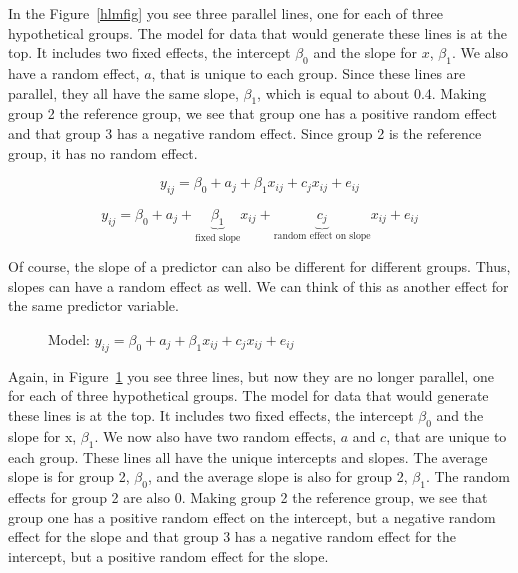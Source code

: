 In the Figure~\ref{hlmfig} you see three parallel lines, one for each of three hypothetical groups. The model for data that would generate these lines is at the top. It includes two fixed effects, the intercept $\beta_0$ and the slope for $x$, $\beta_1$. We also have a random effect, $a$, that is unique to each group. Since these lines are parallel, they all have the same slope, $\beta_1$, which is equal to about 0.4. Making group 2 the reference group, we see that group one has a positive random effect and that group 3 has a negative random effect. Since group 2 is the reference group, it has no random effect.

\[
y_{ij} = \beta_0+a_j+\beta_1x_{ij}+c_jx_{ij}+e_{ij}
\]

\[
y_{ij} = \beta_0+a_j+\underbrace{\beta_1}_{\text{fixed slope}}x_{ij}+\underbrace{c_j}_{\text{random effect on slope}}x_{ij}+e_{ij}
\]

Of course, the slope of a predictor can also be different for different groups. Thus, slopes can have a random effect as well. We can think of this as another effect for the same predictor variable.

\begin{figure}
  \centering
  \caption{Model: $y_{ij} = \beta_0+a_j+\beta_1x_{ij}+c_jx_{ij}+e_{ij}$}\label{hlmfig2}
\end{figure}


Again, in Figure~\ref{hlmfig2} you see three lines, but now they are no longer parallel, one for each of three hypothetical groups. The model for data that would generate these lines is at the top. It includes two fixed effects, the intercept $\beta_0$ and the slope for x, $\beta_1$. We now also have two random effects, $a$ and $c$, that are unique to each group. These lines all have the unique intercepts and slopes. The average slope is for group 2, $\beta_0$, and the average slope is also for group 2, $\beta_1$. The random effects for group 2 are also 0. Making group 2 the reference group, we see that group one has a positive random effect on the intercept, but a negative random effect for the slope and that group 3 has a negative random effect for the intercept, but a positive random effect for the slope.

